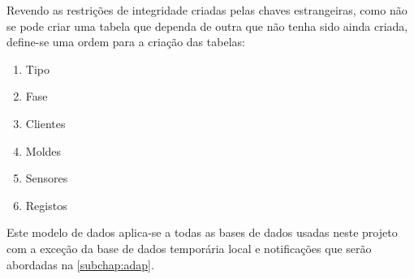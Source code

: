 \documentclass[11pt,twoside,a4paper]{report}
\begin{document}
Revendo as restrições de integridade criadas pelas chaves estrangeiras, como não se pode criar uma tabela que dependa de outra que não tenha sido ainda criada, define-se uma ordem para a criação das tabelas:
\begin{enumerate}[noitemsep]
	\item Tipo
	\item Fase
	\item Clientes
	\item Moldes
	\item Sensores
	\item Registos
\end{enumerate}
Este modelo de dados aplica-se a todas as bases de dados usadas neste projeto com a exceção da base de dados temporária local e notificações que serão abordadas na \autoref{subchap:adap}.
\end{document}
